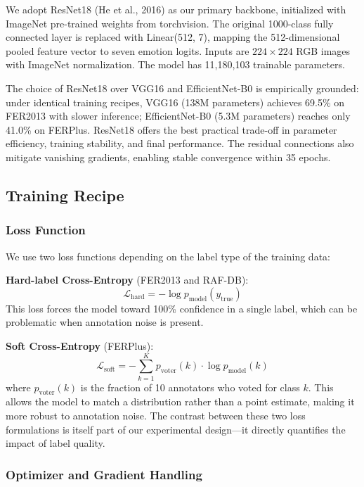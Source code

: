 \documentclass[12pt,a4paper]{article}
\begin{document}
We adopt ResNet18 (He et al., 2016) as our primary backbone, initialized with ImageNet pre-trained weights from torchvision. The original 1000-class fully connected layer is replaced with Linear(512, 7), mapping the 512-dimensional pooled feature vector to seven emotion logits. Inputs are $224\times224$ RGB images with ImageNet normalization. The model has 11,180,103 trainable parameters.

The choice of ResNet18 over VGG16 and EfficientNet-B0 is empirically grounded: under identical training recipes, VGG16 (138M parameters) achieves 69.5\% on FER2013 with slower inference; EfficientNet-B0 (5.3M parameters) reaches only 41.0\% on FERPlus. ResNet18 offers the best practical trade-off in parameter efficiency, training stability, and final performance. The residual connections also mitigate vanishing gradients, enabling stable convergence within 35 epochs.

\subsection{Training Recipe}

\subsubsection{Loss Function}

We use two loss functions depending on the label type of the training data:

\textbf{Hard-label Cross-Entropy} (FER2013 and RAF-DB):
\begin{equation}
\mathcal{L}_{\text{hard}} = -\log p_{\text{model}}(y_{\text{true}})
\end{equation}
This loss forces the model toward 100\% confidence in a single label, which can be problematic when annotation noise is present.

\textbf{Soft Cross-Entropy} (FERPlus):
\begin{equation}
\mathcal{L}_{\text{soft}} = -\sum_{k=1}^{K} p_{\text{voter}}(k) \cdot \log p_{\text{model}}(k)
\end{equation}
where $p_{\text{voter}}(k)$ is the fraction of 10 annotators who voted for class $k$. This allows the model to match a distribution rather than a point estimate, making it more robust to annotation noise. The contrast between these two loss formulations is itself part of our experimental design---it directly quantifies the impact of label quality.

\subsubsection{Optimizer and Gradient Handling}
\end{document}
